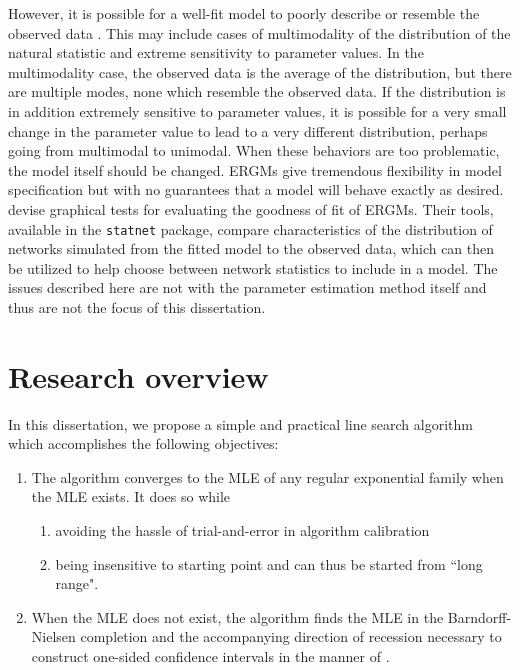 However, it is possible for a well-fit model to poorly describe or resemble the 
observed data \citep{Handcock:degeneracy,ergm}.  This may include cases of multimodality of 
the distribution of the natural statistic and extreme sensitivity to parameter
values.  %
In the multimodality case, the observed data is the average
of the distribution, but there are multiple modes, none which resemble the observed
data.  If the distribution is in addition extremely sensitive to parameter values,
it is possible for a very small change in the parameter value to lead to a 
very different distribution, perhaps going from multimodal to unimodal.
When these behaviors are too problematic, the model itself
should be changed.  ERGMs give tremendous
flexibility in model specification but with no guarantees that a model will behave exactly as desired.  \citet*{GOF} devise graphical tests for evaluating the goodness of fit of ERGMs.
Their tools, available in the \texttt{statnet} package, compare characteristics of 
the distribution of networks simulated from the fitted model to the observed data, 
which can then be utilized to help choose between network statistics to include in a 
model. The issues described here are not with the parameter estimation method 
itself and thus are not the focus of this dissertation.  


\section{Research overview} \label{S:Research overview}
In this dissertation, we propose a simple and practical line search algorithm which
accomplishes the following objectives:
\begin{enumerate}
\item The algorithm converges to the MLE of any regular exponential family 
when the MLE exists.  It does so while
\begin{enumerate}
	\item avoiding the hassle of trial-and-error in algorithm calibration
	\item being insensitive to starting point and can thus be started from ``long range".
\end{enumerate}
\item When the MLE does not exist, the algorithm finds the MLE in the Barndorff-Nielsen completion and the 
accompanying direction of recession necessary to construct one-sided 
confidence intervals in the manner of \citet{Geyer:gdor}.
\end{enumerate}

